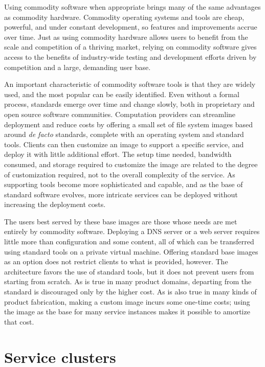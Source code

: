 Using commodity software when appropriate brings many of the same advantages as commodity hardware. Commodity operating systems and tools are cheap, powerful, and under constant development, so features and improvements accrue over time. Just as using commodity hardware allows users to benefit from the scale and competition of a thriving market, relying on commodity software gives access to the benefits of industry-wide testing and development efforts driven by competition and a large, demanding user base.

An important characteristic of commodity software tools is that they are widely used, and the most popular can be easily identified. Even without a formal process, standards emerge over time and change slowly, both in proprietary and open source software communities. Computation providers can streamline deployment and reduce costs by offering a small set of file system images based around \emph{de facto} standards, complete with an operating system and standard tools. Clients can then customize an image to support a specific service, and deploy it with little additional effort. The setup time needed, bandwidth consumed, and storage required to customize the image are related to the degree of customization required, not to the overall complexity of the service. As supporting tools become more sophisticated and capable, and as the base of standard software evolves, more intricate services can be deployed without increasing the deployment costs.

The users best served by these base images are those whose needs are met entirely by commodity software. Deploying a DNS server or a web server requires little more than configuration and some content, all of which can be transferred using standard tools on a private virtual machine. Offering standard base images as an option does not restrict clients to what is provided, however. The architecture favors the use of standard tools, but it does not prevent users from starting from scratch. As is true in many product domains, departing from the standard is discouraged only by the higher cost. As is also true in many kinds of product fabrication, making a custom image incurs some one-time costs; using the image as the base for many service instances makes it possible to amortize that cost.

\section{Service clusters}

